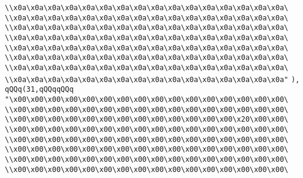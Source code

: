 \verb|\\x0a\x0a\x0a\x0a\x0a\x0a\x0a\x0a\x0a\x0a\x0a\x0a\x0a\x0a\x0a\x0a\|\newline
\verb|\\x0a\x0a\x0a\x0a\x0a\x0a\x0a\x0a\x0a\x0a\x0a\x0a\x0a\x0a\x0a\x0a\|\newline
\verb|\\x0a\x0a\x0a\x0a\x0a\x0a\x0a\x0a\x0a\x0a\x0a\x0a\x0a\x0a\x0a\x0a\|\newline
\verb|\\x0a\x0a\x0a\x0a\x0a\x0a\x0a\x0a\x0a\x0a\x0a\x0a\x0a\x0a\x0a\x0a\|\newline
\verb|\\x0a\x0a\x0a\x0a\x0a\x0a\x0a\x0a\x0a\x0a\x0a\x0a\x0a\x0a\x0a\x0a\|\newline
\verb|\\x0a\x0a\x0a\x0a\x0a\x0a\x0a\x0a\x0a\x0a\x0a\x0a\x0a\x0a\x0a\x0a\|\newline
\verb|\\x0a\x0a\x0a\x0a\x0a\x0a\x0a\x0a\x0a\x0a\x0a\x0a\x0a\x0a\x0a\x0a\|\newline
\verb|\\x0a\x0a\x0a\x0a\x0a\x0a\x0a\x0a\x0a\x0a\x0a\x0a\x0a\x0a\x0a\x0a"|\newline
\verb|),|\newline
\verb|qQQq(31,qQQqqQQq|\newline
\verb|"\x00\x00\x00\x00\x00\x00\x00\x00\x00\x00\x00\x00\x00\x00\x00\x00\|\newline
\verb|\\x00\x00\x00\x00\x00\x00\x00\x00\x00\x00\x00\x00\x00\x00\x00\x00\|\newline
\verb|\\x00\x00\x00\x00\x00\x00\x00\x00\x00\x00\x00\x00\x00\x20\x00\x00\|\newline
\verb|\\x00\x00\x00\x00\x00\x00\x00\x00\x00\x00\x00\x00\x00\x00\x00\x00\|\newline
\verb|\\x00\x00\x00\x00\x00\x00\x00\x00\x00\x00\x00\x00\x00\x00\x00\x00\|\newline
\verb|\\x00\x00\x00\x00\x00\x00\x00\x00\x00\x00\x00\x00\x00\x00\x00\x00\|\newline
\verb|\\x00\x00\x00\x00\x00\x00\x00\x00\x00\x00\x00\x00\x00\x00\x00\x00\|\newline
\verb|\\x00\x00\x00\x00\x00\x00\x00\x00\x00\x00\x00\x00\x00\x00\x00\x00\|\newline
